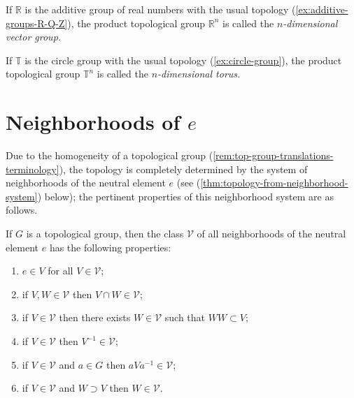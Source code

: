 \begin{example}
    If \( \mathbb{R} \) is the additive group of real numbers with the usual topology (\ref{ex:additive-groups-R-Q-Z}),
    the product topological group \( \mathbb{R}^n \) is called the \emph{\( n \)-dimensional vector group.}
\end{example}

\begin{example}
    If \( \mathbb{T} \) is the circle group with the usual topology (\ref{ex:circle-group}),
    the product topological group \( \mathbb{T}^n \) is called the \emph{\( n \)-dimensional torus.}
\end{example}



\section{Neighborhoods of \( e \)}
Due to the homogeneity of a topological group (\ref{rem:top-group-translations-terminology}),
the topology is completely determined by the system of neighborhoods of the neutral element \( e \) (see (\ref{thm:topology-from-neighborhood-system}) below);
the pertinent properties of this neighborhood system are as follows.


\begin{theorem}
    \label{thm:identity-neighborhood-properties}


    If \( G \) is a topological group, then the class \( \mathcal{V} \) of all neighborhoods of the neutral element \( e \) has the following properties:
    \begin{enumerate}
        \item \( e \in V \) for all \( V \in \mathcal{V} \);
        \item if \( V, W \in \mathcal{V} \) then \( V \cap W \in \mathcal{V} \);
        \item if \( V \in \mathcal{V} \) then there exists \( W \in \mathcal{V} \) such that \( WW \subset V \);
        \item if \( V \in \mathcal{V} \) then \( V^{-1} \in \mathcal{V} \);
        \item if \( V \in \mathcal{V} \) and \( a \in G \) then \( aVa^{-1} \in \mathcal{V} \);
        \item if \( V \in \mathcal{V} \) and \( W \supset V \) then \( W \in \mathcal{V} \).
    \end{enumerate}
\end{theorem}

